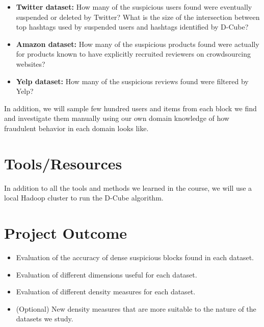 \documentclass[10pt,twocolumn]{article}
\begin{document}
\begin{itemize}
	\item \textbf{Twitter dataset:} How many of the suspicious users found were eventually suspended or deleted by Twitter? What is the size of the intersection between top hashtags used by suspended users and hashtags identified by D-Cube?
	\item \textbf{Amazon dataset:} How many of the suspicious products found were actually for products known to have explicitly recruited  reviewers on crowdsourcing websites?
	\item \textbf{Yelp dataset:} How many of the suspicious reviews found were filtered by Yelp?
\end{itemize}

In addition, we will sample few hundred users and items from each block we find and investigate them manually using our own domain knowledge of how fraudulent behavior in each domain looks like.


 
\section{Tools/Resources}
In addition to all the tools and methods we learned in the course, we will use a local Hadoop cluster to run the D-Cube algorithm.

\section{Project Outcome}

\begin{itemize}
	
	\item Evaluation of the accuracy of dense suspicious blocks found in each dataset.
	\item Evaluation of different dimensions useful for each dataset. 
	\item Evaluation of different density measures for each dataset.
	\item (Optional) New density measures that are more suitable to the nature of the  datasets we study.
\end{itemize}



\end{document}

